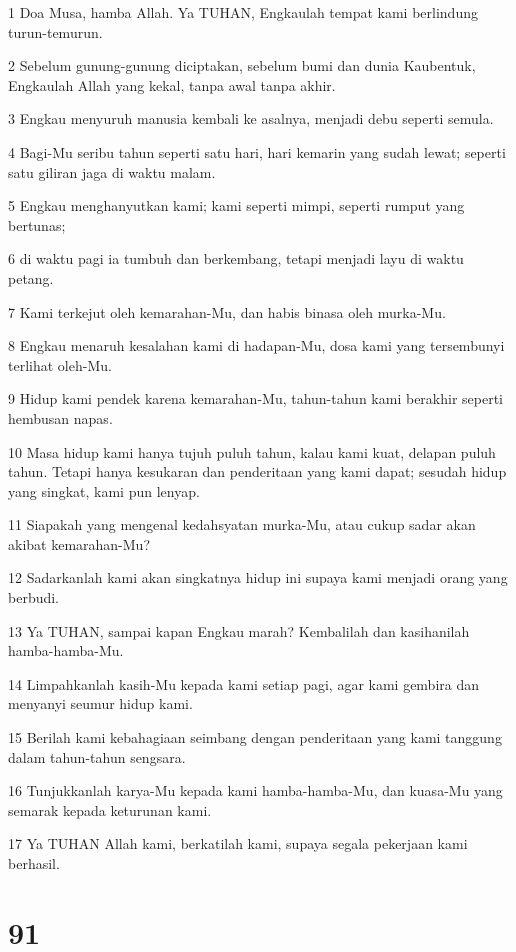 \par 1 Doa Musa, hamba Allah. Ya TUHAN, Engkaulah tempat kami berlindung turun-temurun.
\par 2 Sebelum gunung-gunung diciptakan, sebelum bumi dan dunia Kaubentuk, Engkaulah Allah yang kekal, tanpa awal tanpa akhir.
\par 3 Engkau menyuruh manusia kembali ke asalnya, menjadi debu seperti semula.
\par 4 Bagi-Mu seribu tahun seperti satu hari, hari kemarin yang sudah lewat; seperti satu giliran jaga di waktu malam.
\par 5 Engkau menghanyutkan kami; kami seperti mimpi, seperti rumput yang bertunas;
\par 6 di waktu pagi ia tumbuh dan berkembang, tetapi menjadi layu di waktu petang.
\par 7 Kami terkejut oleh kemarahan-Mu, dan habis binasa oleh murka-Mu.
\par 8 Engkau menaruh kesalahan kami di hadapan-Mu, dosa kami yang tersembunyi terlihat oleh-Mu.
\par 9 Hidup kami pendek karena kemarahan-Mu, tahun-tahun kami berakhir seperti hembusan napas.
\par 10 Masa hidup kami hanya tujuh puluh tahun, kalau kami kuat, delapan puluh tahun. Tetapi hanya kesukaran dan penderitaan yang kami dapat; sesudah hidup yang singkat, kami pun lenyap.
\par 11 Siapakah yang mengenal kedahsyatan murka-Mu, atau cukup sadar akan akibat kemarahan-Mu?
\par 12 Sadarkanlah kami akan singkatnya hidup ini supaya kami menjadi orang yang berbudi.
\par 13 Ya TUHAN, sampai kapan Engkau marah? Kembalilah dan kasihanilah hamba-hamba-Mu.
\par 14 Limpahkanlah kasih-Mu kepada kami setiap pagi, agar kami gembira dan menyanyi seumur hidup kami.
\par 15 Berilah kami kebahagiaan seimbang dengan penderitaan yang kami tanggung dalam tahun-tahun sengsara.
\par 16 Tunjukkanlah karya-Mu kepada kami hamba-hamba-Mu, dan kuasa-Mu yang semarak kepada keturunan kami.
\par 17 Ya TUHAN Allah kami, berkatilah kami, supaya segala pekerjaan kami berhasil.

\chapter{91}


